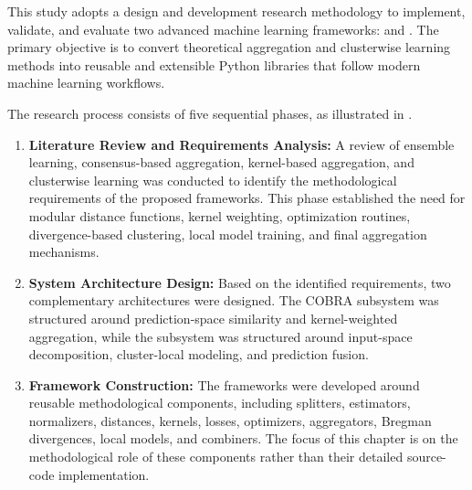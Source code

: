 \hs This study adopts a design and development research methodology to implement, validate, and evaluate two advanced machine learning frameworks: \GradientCOBRA{} and \KFCProcedure{}. The primary objective is to convert theoretical aggregation and clusterwise learning methods into reusable and extensible Python libraries that follow modern machine learning workflows.

The research process consists of five sequential phases, as illustrated in .

\begin{enumerate}
    \item \textbf{Literature Review and Requirements Analysis:} A review of ensemble learning, consensus-based aggregation, kernel-based aggregation, and clusterwise learning was conducted to identify the methodological requirements of the proposed frameworks. This phase established the need for modular distance functions, kernel weighting, optimization routines, divergence-based clustering, local model training, and final aggregation mechanisms.

    \item \textbf{System Architecture Design:} Based on the identified requirements, two complementary architectures were designed. The COBRA subsystem was structured around prediction-space similarity and kernel-weighted aggregation, while the \KFCProcedure{} subsystem was structured around input-space decomposition, cluster-local modeling, and prediction fusion.

    \item \textbf{Framework Construction:} The frameworks were developed around reusable methodological components, including splitters, estimators, normalizers, distances, kernels, losses, optimizers, aggregators, Bregman divergences, local models, and combiners. The focus of this chapter is on the methodological role of these components rather than their detailed source-code implementation.




\end{enumerate}
